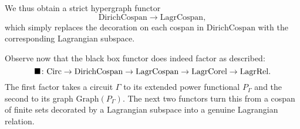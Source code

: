 We thus obtain a strict hypergraph functor 
\[   
\mathrm{DirichCospan} \to \mathrm{LagrCospan},
\]
which simply replaces the decoration on each cospan in $\mathrm{DirichCospan}$
with the corresponding Lagrangian subspace.

Observe now that the black box functor does indeed factor as described:
\[
    \blacksquare{\colon} \mathrm{Circ} \to \mathrm{DirichCospan} \to \mathrm{LagrCospan}
    \to \mathrm{LagrCorel} \to \mathrm{LagrRel}.
\]
The first factor takes a circuit $\Gamma$ to its extended power functional
$P_\Gamma$ and the second to its graph $\mathrm{Graph}(P_\Gamma)$. The next two
functors turn this from a cospan of finite sets decorated by a Lagrangian
subspace into a genuine Lagrangian relation.



